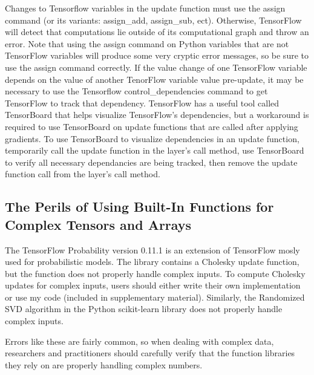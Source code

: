 Changes to Tensorflow variables in the update function must use the assign command (or its variants: assign\_add, assign\_sub, ect). Otherwise, TensorFlow will detect that computations lie outside of its computational graph and throw an error. Note that using the assign command on Python variables that are not TensorFlow variables will produce some very cryptic error messages, so be sure to use the assign command correctly. If the value change of one TensorFlow variable depends on the value of another TenorFlow variable value pre-update, it may be necessary to use the Tensorflow control\_dependencies command to get TensorFlow to track that dependency. TensorFlow has a useful tool called TensorBoard that helps visualize TensorFlow's dependencies, but a workaround is required to use TensorBoard on update functions that are called after applying gradients. To use TensorBoard to visualize dependencies in an update function, temporarily call the update function in the layer's call method, use TensorBoard to verify all necessary dependancies are being tracked, then remove the update function call from the layer's call method.

\subsection{The Perils of Using Built-In Functions for Complex Tensors and Arrays}
The TensorFlow Probability version 0.11.1 \cite{tensorflowprobability} is an extension of TensorFlow mosly used for probabilistic models. The library contains a Cholesky update function, but the function does not properly handle complex inputs. To compute Cholesky updates for complex inputs, users should either write their own implementation or use my code (included in supplementary material). Similarly, the Randomized SVD algorithm in the Python scikit-learn library does not properly handle complex inputs.

Errors like these are fairly common, so when dealing with complex data, researchers and practitioners should carefully verify that the function libraries they rely on are properly handling complex numbers.
